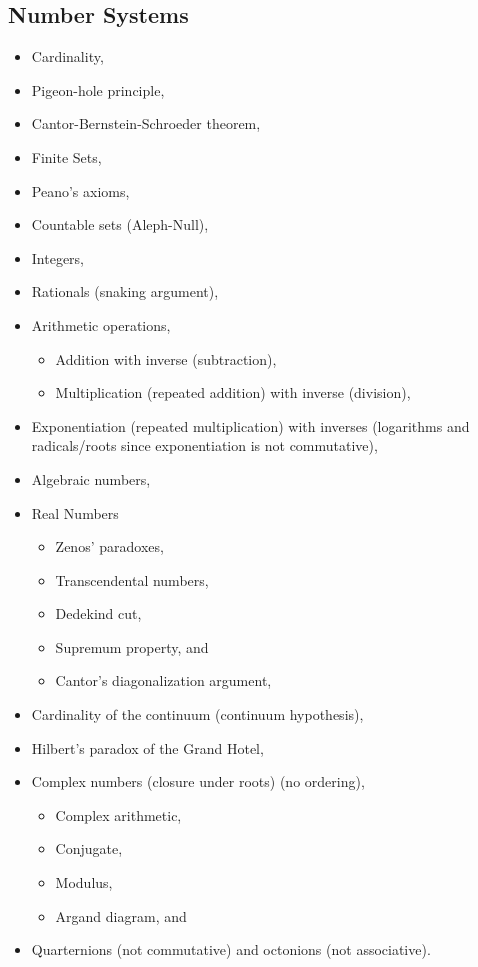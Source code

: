 \hypertarget{number-systems}{%
\subsection{Number Systems}\label{number-systems}}

\begin{itemize}
\tightlist
\item
  Cardinality,
\item
  Pigeon-hole principle,
\item
  Cantor-Bernstein-Schroeder theorem,
\item
  Finite Sets,
\item
  Peano's axioms,
\item
  Countable sets (Aleph-Null),
\item
  Integers,
\item
  Rationals (snaking argument),
\item
  Arithmetic operations,

  \begin{itemize}
  \tightlist
  \item
    Addition with inverse (subtraction),
  \item
    Multiplication (repeated addition) with inverse (division),
  \end{itemize}
\item
  Exponentiation (repeated multiplication) with inverses (logarithms and
  radicals/roots since exponentiation is not commutative),
\item
  Algebraic numbers,
\item
  Real Numbers

  \begin{itemize}
  \tightlist
  \item
    Zenos' paradoxes,
  \item
    Transcendental numbers,
  \item
    Dedekind cut,
  \item
    Supremum property, and
  \item
    Cantor's diagonalization argument,
  \end{itemize}
\item
  Cardinality of the continuum (continuum hypothesis),
\item
  Hilbert's paradox of the Grand Hotel,
\item
  Complex numbers (closure under roots) (no ordering),

  \begin{itemize}
  \tightlist
  \item
    Complex arithmetic,
  \item
    Conjugate,
  \item
    Modulus,
  \item
    Argand diagram, and
  \end{itemize}
\item
  Quarternions (not commutative) and octonions (not associative).
\end{itemize}

